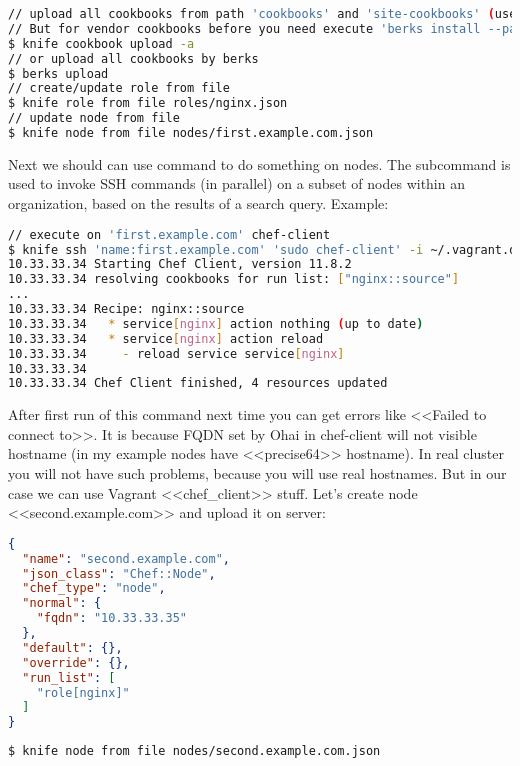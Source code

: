 \begin{lstlisting}[language=Bash,label=lst:my-serer-cloud-role4]
// upload all cookbooks from path 'cookbooks' and 'site-cookbooks' (use --force if cookbook frozen).
// But for vendor cookbooks before you need execute 'berks install --path cookbooks'
$ knife cookbook upload -a
// or upload all cookbooks by berks
$ berks upload
// create/update role from file
$ knife role from file roles/nginx.json
// update node from file
$ knife node from file nodes/first.example.com.json
\end{lstlisting}

Next we should can use  command to do something on nodes. The  subcommand is used to invoke SSH commands (in parallel) on a subset of nodes within an organization, based on the results of a search query. Example:

\begin{lstlisting}[language=Bash,label=lst:my-serer-cloud-role5]
// execute on 'first.example.com' chef-client
$ knife ssh 'name:first.example.com' 'sudo chef-client' -i ~/.vagrant.d/insecure_private_key -x vagrant
10.33.33.34 Starting Chef Client, version 11.8.2
10.33.33.34 resolving cookbooks for run list: ["nginx::source"]
...
10.33.33.34 Recipe: nginx::source
10.33.33.34   * service[nginx] action nothing (up to date)
10.33.33.34   * service[nginx] action reload
10.33.33.34     - reload service service[nginx]
10.33.33.34
10.33.33.34 Chef Client finished, 4 resources updated
\end{lstlisting}

After first run of this command next time you can get errors like <<Failed to connect to>>. It is because FQDN set by Ohai in chef-client will not visible hostname (in my example nodes have <<precise64>> hostname). In real cluster you will not have such problems, because you will use real hostnames. But in our case we can use Vagrant <<chef\_client>> stuff. Let's create node <<second.example.com>> and upload it on server:

\begin{lstlisting}[language=JSON,label=lst:my-serer-cloud-role6,title=my-server-cloud/nodes/second.example.com.json]
{
  "name": "second.example.com",
  "json_class": "Chef::Node",
  "chef_type": "node",
  "normal": {
    "fqdn": "10.33.33.35"
  },
  "default": {},
  "override": {},
  "run_list": [
    "role[nginx]"
  ]
}
\end{lstlisting}

\begin{lstlisting}[language=Bash,label=lst:my-serer-cloud-role7]
$ knife node from file nodes/second.example.com.json
\end{lstlisting}


